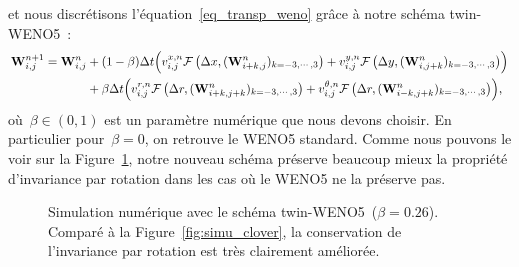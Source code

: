 \documentclass[11pt]{amsart}
\numberwithin{equation}{section}
\newcommand{\W}{{\bf W}}
\newcommand{\twinweno}{twin-WENO5}
\begin{document}
et nous discrétisons l'équation~\eqref{eq_transp_weno} grâce à notre schéma \twinweno\ : 
\begin{equation}\label{eq:twin-WENO5}
  \begin{split}
\W^{n+1}_{i,j} =\W^n_{i,j} &+ (1-\beta)\Delta t \Bigl(v_{i,j}^{x,n}
\mathcal{F}\left(\Delta x,(\W^n_{i+k,j})_{k=-3,\cdots, 3}\right) +
v_{i,j}^{y,n} \mathcal{F}\left(\Delta y,(\W^n_{i,j+k})_{k=-3,\cdots,
    3}\right)\Bigr)\\
&+\beta\Delta t \Bigl(v_{i,j}^{r,n}
\mathcal{F}\left(\Delta r,(\W^n_{i+k,j+k})_{k=-3,\cdots, 3}\right) +
v_{i,j}^{\theta,n} \mathcal{F}\left(\Delta r,(\W^n_{i-k,j+k})_{k=-3,\cdots, 3}\right)\Bigr),
  \end{split}
\end{equation}
où~$\beta\in(0,1)$ est un paramètre numérique que nous devons choisir. 
En particulier pour~$\beta=0$, on retrouve le WENO5 standard. 
Comme nous pouvons le voir sur la Figure~\ref{fig:compWENO5}, notre nouveau schéma préserve beaucoup mieux la propriété d'invariance par rotation dans les cas où le WENO5 ne la préserve pas.

\begin{figure}[!htb]
\caption{Simulation numérique avec le schéma \twinweno\  ($\beta=0.26$).  
Comparé à la Figure~\ref{fig:simu_clover}, la conservation de l'invariance par rotation est très clairement améliorée. 
}\label{fig:compWENO5}
\end{figure}
\end{document}
